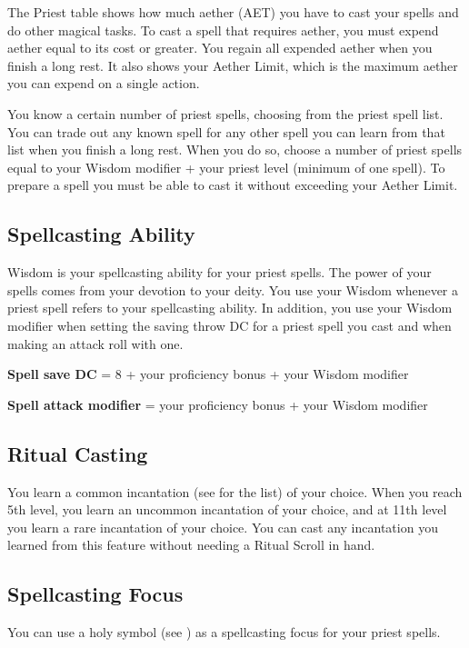 The Priest table shows how much aether (AET) you have to cast your spells and do other magical tasks. To cast a spell that requires aether, you must expend aether equal to its cost or greater. You regain all expended aether when you finish a long rest. It also shows your Aether Limit, which is the maximum aether you can expend on a single action.

You know a certain number of priest spells, choosing from the priest spell list. You can trade out any known spell for any other spell you can learn from that list when you finish a long rest. When you do so, choose a number of priest spells equal to your Wisdom modifier + your priest level (minimum of one spell). To prepare a spell you must be able to cast it without exceeding your Aether Limit.

\subsection{Spellcasting Ability}

Wisdom is your spellcasting ability for your priest spells. The power of your spells comes from your devotion to your deity. You use your Wisdom whenever a priest spell refers to your spellcasting ability. In addition, you use your Wisdom modifier when setting the saving throw DC for a priest spell you cast and when making an attack roll with one.

\textbf{Spell save DC} = 8 + your proficiency bonus + your Wisdom modifier

\textbf{Spell attack modifier} = your proficiency bonus + your Wisdom modifier

\subsection{Ritual Casting}

You learn a common incantation (see  for the list) of your choice. When you reach 5th level, you learn an uncommon incantation of your choice, and at 11th level you learn a rare incantation of your choice. You can cast any incantation you learned from this feature without needing a Ritual Scroll in hand.

\subsection{Spellcasting Focus}

You can use a holy symbol (see ) as a spellcasting focus for your priest spells.

